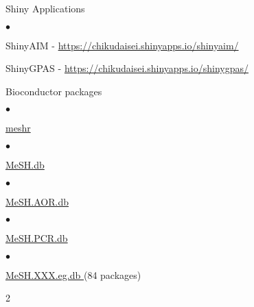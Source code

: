 \documentclass[margin,line,10pt]{res}
\newenvironment{list1}{
  \begin{list}{\ding{113}}{%
      \setlength{\itemsep}{0in}
      \setlength{\parsep}{0in} \setlength{\parskip}{0in}
      \setlength{\topsep}{0in} \setlength{\partopsep}{0in} 
      \setlength{\leftmargin}{0.17in}}}{\end{list}}
\newenvironment{list2}{
  \begin{list}{$\bullet$}{%
      \setlength{\itemsep}{0in}
      \setlength{\parsep}{0in} \setlength{\parskip}{0in}
      \setlength{\topsep}{0in} \setlength{\partopsep}{0in} 
      \setlength{\leftmargin}{0.2in}}}{\end{list}}
\begin{document}
\begin{resume}
\begin{list1}
\vspace{0.3cm}
\item[] Shiny Applications
  \begin{list2}
  \item ShinyAIM - \textcolor{blue}{\href{https://chikudaisei.shinyapps.io/shinyaim/}{https://chikudaisei.shinyapps.io/shinyaim/}}

    \vspace{0.3cm}
    
\item ShinyGPAS - \textcolor{blue}{\href{https://chikudaisei.shinyapps.io/shinygpas/}{https://chikudaisei.shinyapps.io/shinygpas/}} 
\end{list2}



\vspace{0.3cm}
\item[] Bioconductor packages
\begin{list2}
\item \textcolor{blue}{\href{http://bioconductor.org/packages/release/bioc/html/meshr.html}{meshr}}
\end{list2}
\vspace{0.3cm}
\begin{list2}
\item  \textcolor{blue}{\href{http://bioconductor.org/packages/release/data/annotation/html/MeSH.db.html}{MeSH.db}}
\end{list2}
\vspace{0.3cm}
\begin{list2}
\item \textcolor{blue}{\href{http://www.bioconductor.org/packages/release/data/annotation/html/MeSH.AOR.db.html}{MeSH.AOR.db}}
\end{list2}
\vspace{0.3cm}
\begin{list2}
\item \textcolor{blue}{\href{http://www.bioconductor.org/packages/release/data/annotation/html/MeSH.PCR.db.html}{MeSH.PCR.db}}
\end{list2}
\vspace{0.3cm}
\begin{list2}
\item \textcolor{blue}{\href{http://www.bioconductor.org/packages/release/data/annotation/}{MeSH.XXX.eg.db }} (84 packages)
\end{list2}
\begin{multicols}{2}
\begin{itemize}

\end{itemize}
\end{multicols}
\end{list1}
\end{resume}
\end{document}
